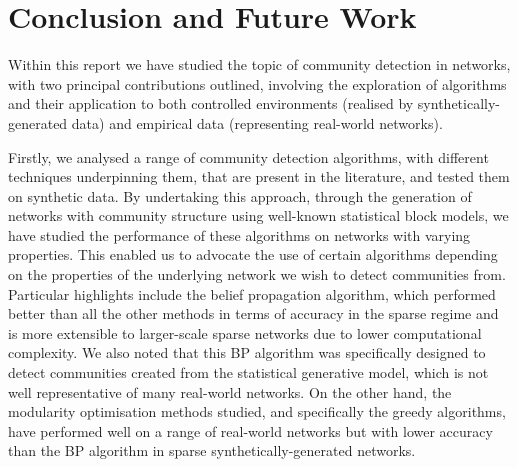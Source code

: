 
\chapter{Conclusion and Future Work}

\label{cha:Conclusion}


Within this report we have studied the topic of community detection in networks, with two principal contributions outlined, involving the exploration of algorithms and their application to both controlled environments (realised by synthetically-generated data) and empirical data (representing real-world networks).

Firstly, we analysed a range of community detection algorithms, with different techniques underpinning them, that are present in the literature, and tested them on synthetic data.
By undertaking this approach, through the generation of networks with community structure using well-known statistical block models, we have studied the performance of these algorithms on networks with varying properties.
This enabled us to advocate the use of certain algorithms depending on the properties of the underlying network we wish to detect communities from.
Particular highlights include the belief propagation algorithm, which performed better than all the other methods in terms of accuracy in the sparse regime and is more extensible to larger-scale sparse networks due to lower computational complexity.
We also noted that this BP algorithm was specifically designed to detect communities created from the statistical generative model, which is not well representative of many real-world networks.
On the other hand, the modularity optimisation methods studied, and specifically the greedy algorithms, have performed well on a range of real-world networks but with lower accuracy than the BP algorithm in sparse synthetically-generated networks.


